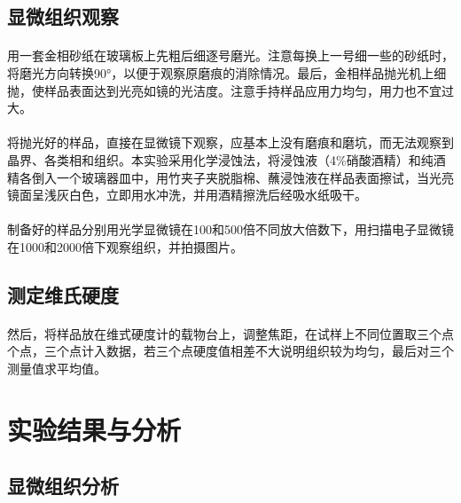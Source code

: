 \documentclass[12pt]{ctexart}
\begin{document}
\subsection{显微组织观察}
\paragraph{}
用一套金相砂纸在玻璃板上先粗后细逐号磨光。注意每换上一号细一些的砂纸时，将磨光方向转换90°，以便于观察原磨痕的消除情况。最后，金相样品抛光机上细抛，使样品表面达到光亮如镜的光洁度。注意手持样品应用力均匀，用力也不宜过大。
\paragraph{}
将抛光好的样品，直接在显微镜下观察，应基本上没有磨痕和磨坑，而无法观察到晶界、各类相和组织。本实验采用化学浸蚀法，将浸蚀液（4\%硝酸酒精）和纯酒精各倒入一个玻璃器皿中，用竹夹子夹脱脂棉、蘸浸蚀液在样品表面擦试，当光亮镜面呈浅灰白色，立即用水冲洗，并用酒精擦洗后经吸水纸吸干。
\paragraph{}
制备好的样品分别用光学显微镜在100和500倍不同放大倍数下，用扫描电子显微镜在1000和2000倍下观察组织，并拍摄图片。
\subsection{测定维氏硬度}
\paragraph{}
然后，将样品放在维式硬度计的载物台上，调整焦距，在试样上不同位置取三个点个点，三个点计入数据，若三个点硬度值相差不大说明组织较为均匀，最后对三个测量值求平均值。
\section{实验结果与分析}
\subsection{显微组织分析}
\end{document}
